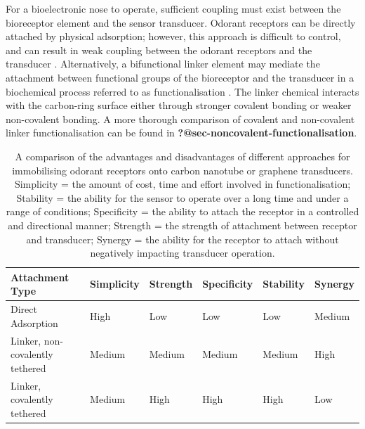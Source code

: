 \documentclass[
  a4paper,
]{scrbook}
\begin{document}
For a bioelectronic nose to operate, sufficient coupling must exist
between the bioreceptor element and the sensor transducer. Odorant
receptors can be directly attached by physical adsorption; however, this
approach is difficult to control, and can result in weak coupling
between the odorant receptors and the transducer \autocite{Dung2018}.
Alternatively, a bifunctional linker element may mediate the attachment
between functional groups of the bioreceptor and the transducer in a
biochemical process referred to as functionalisation
\autocite{Star2003a}. The linker chemical interacts with the carbon-ring
surface either through stronger covalent bonding or weaker non-covalent
bonding. A more thorough comparison of covalent and non-covalent linker
functionalisation can be found in
\textbf{?@sec-noncovalent-functionalisation}.

\hypertarget{tbl-functionalisation-types}{}
\begin{longtable}[t]{>{\raggedright\arraybackslash}p{5.4cm}>{\raggedright\arraybackslash}p{1.45cm}>{\raggedright\arraybackslash}p{1.3cm}>{\raggedright\arraybackslash}p{1.45cm}>{\raggedright\arraybackslash}p{1.3cm}>{\raggedright\arraybackslash}p{1.3cm}}
\caption{\label{tbl-functionalisation-types}A comparison of the advantages and disadvantages of different approaches
for immobilising odorant receptors onto carbon nanotube or graphene
transducers. Simplicity = the amount of cost, time and effort involved
in functionalisation; Stability = the ability for the sensor to operate
over a long time and under a range of conditions; Specificity = the
ability to attach the receptor in a controlled and directional manner;
Strength = the strength of attachment between receptor and transducer;
Synergy = the ability for the receptor to attach without negatively
impacting transducer operation. }\tabularnewline

\toprule
Attachment Type & Simplicity & Strength & Specificity & Stability & Synergy\\
\midrule
Direct Adsorption & High & Low & Low & Low & Medium\\
Linker, non-covalently tethered & Medium & Medium & Medium & Medium & High\\
Linker, covalently tethered & Medium & High & High & High & Low\\
\bottomrule
\end{longtable}

\newpage
{}
\end{document}
